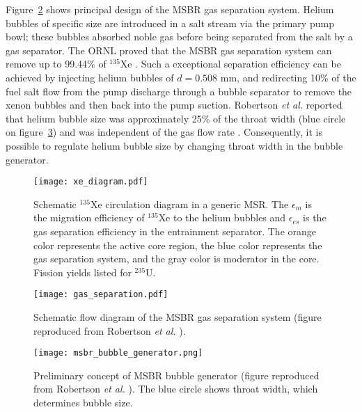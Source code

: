 Figure~\ref{fig:gas_removal_system} shows principal design of the \gls{MSBR} 
gas separation system. Helium bubbles of specific size are introduced in a 
salt stream via the primary pump bowl; these bubbles absorbed noble gas 
before being separated from the salt by a gas separator. The \gls{ORNL} proved 
that the \gls{MSBR} gas separation system can remove up to 99.44\% of 
$^{135}$Xe \cite{briggs_molten-salt_1969}. Such a exceptional separation 
efficiency can be achieved by injecting helium bubbles of $d=0.508$ mm, and 
redirecting 10\% of the fuel salt flow from the pump discharge through a 
bubble separator to remove the xenon bubbles and then back into the pump 
suction. Robertson \emph{et al.} reported that helium bubble size was 
approximately 25\% of the throat width (blue circle on 
figure~\ref{fig:bubble_separator}) and was independent of the gas flow rate 
\cite{robertson_conceptual_1971}. Consequently, it is possible to regulate 
helium bubble size by changing throat width in the bubble generator.
\begin{figure}[htp!] %
	\centering
	\texttt{[image: xe\_diagram.pdf]}
	\caption{Schematic $^{135}$Xe circulation diagram in a generic \gls{MSR}. 
	The $\epsilon_m$ is the migration efficiency of $^{135}$Xe to the helium 
	bubbles and $\epsilon_{es}$ is the gas separation efficiency in the 
	entrainment separator. The orange color represents the active core region, 
	the blue color represents the gas separation system, and the gray color is 
	moderator in the core. Fission yields listed for $^{235}$U.}
	\label{fig:xe_diagram}
\end{figure}
\begin{figure}[htp!] %
  \centering
  \texttt{[image: gas\_separation.pdf]}
  \caption{Schematic flow diagram of the \gls{MSBR} gas separation system 
  (figure reproduced from Robertson \emph{et al.} 
  \cite{robertson_conceptual_1971}).}
  \label{fig:gas_removal_system}
\end{figure}
\begin{figure}[htp!] %
  \centering
  \texttt{[image: msbr\_bubble\_generator.png]}
  \caption{Preliminary concept of \gls{MSBR} bubble generator (figure 
  reproduced from Robertson \emph{et al.} \cite{robertson_conceptual_1971}). 
  The blue circle shows throat width, which determines bubble size.}
		\vspace{-0.25in}
  \label{fig:bubble_separator}
\end{figure}
